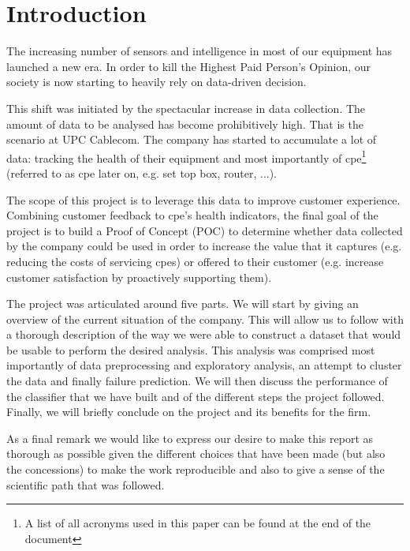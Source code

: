 
\chapter*{Introduction}
The increasing number of sensors and intelligence in most of our equipment has launched a new era. In order to kill the Highest Paid Person's Opinion, our society is now starting to heavily rely on data-driven decision. 

This shift was initiated by the spectacular increase in data collection. The amount of data to be analysed has become prohibitively high. That is the scenario at UPC Cablecom. The company has started to accumulate a lot of data: tracking the health of their equipment and most importantly of \acrlong{cpe}\footnote{A list of all acronyms used in this paper can be found at the end of the document} (referred to as \acrshort{cpe} later on, e.g. set top box, router, ...). 

The scope of this project is to leverage this data to improve customer experience. Combining customer feedback to \acrshort{cpe}'s health indicators, the final goal of the project is to build a Proof of Concept (POC) to determine whether data collected by the company could be used in order to increase the value that it captures (e.g. reducing the costs of servicing \acrshort{cpe}s) or offered to their customer (e.g. increase customer satisfaction by proactively supporting them).

The project was articulated around five parts. We will start by giving an overview of the current situation of the company. This will allow us to follow with a thorough description of the way we were able to construct a dataset that would be usable to perform the desired analysis. This analysis was comprised most importantly of data preprocessing and exploratory analysis, an attempt to cluster the data and finally failure prediction. We will then discuss the performance of the classifier that we have built and of the different steps the project followed. Finally, we will briefly conclude on the project and its benefits for the firm. 

As a final remark we would like to express our desire to make this report as thorough as possible given the different choices that have been made (but also the concessions) to make the work reproducible and also to give a sense of the scientific path that was followed.
